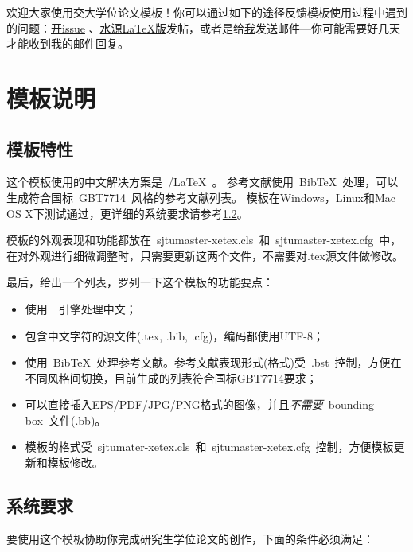欢迎大家使用交大学位论文模板！你可以通过如下的途径反馈模板使用过程中遇到的问题：\href{https://github.com/weijianwen/sjtu-thesis-template-latex/issues}{开issue}
、\href{https://bbs.sjtu.edu.cn/bbsdoc?board=TeX_LaTeX}{水源LaTeX版}发帖，或者是给\href{mailto:weijianwen@gmail.com}{我}发送邮件---你可能需要好几天才能收到我的邮件回复。

\section{模板说明}
\subsection{模板特性}
\label{sec:features}

这个模板使用的中文解决方案是~\XeTeX/\LaTeX~。
参考文献使用~BibTeX~处理，可以生成符合国标~GBT7714~风格的参考文献列表。
模板在Windows，Linux和Mac OS X下测试通过，更详细的系统要求请参考\ref{sec:requirements}。

模板的外观表现和功能都放在~sjtumaster-xetex.cls~和~sjtumaster-xetex.cfg~中，在对外观进行细微调整时，只需要更新这两个文件，不需要对.tex源文件做修改。

最后，给出一个列表，罗列一下这个模板的功能要点：

\begin{itemize}
\item 使用~\XeTeX~引擎处理中文；
\item 包含中文字符的源文件(.tex, .bib, .cfg)，编码都使用UTF-8；
\item 使用~BibTeX~处理参考文献。参考文献表现形式(格式)受~.bst~控制，方便在不同风格间切换，目前生成的列表符合国标GBT7714要求；
\item 可以直接插入EPS/PDF/JPG/PNG格式的图像，并且\emph{不需要}~bounding box~文件(.bb)。
\item 模板的格式受~sjtumater-xetex.cls~和~sjtumaster-xetex.cfg~控制，方便模板更新和模板修改。
\end{itemize}

\subsection{系统要求}
\label{sec:requirements}

要使用这个模板协助你完成研究生学位论文的创作，下面的条件必须满足：

